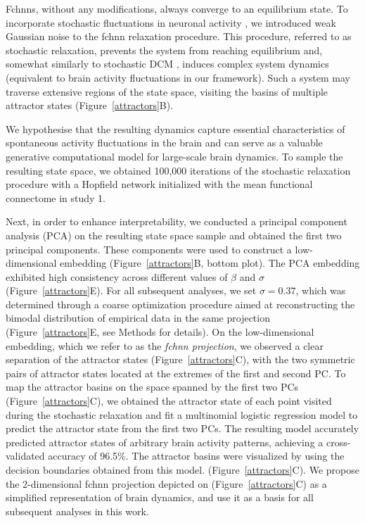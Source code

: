 \documentclass{article}
\begin{document}
Fc\acrshort{hnn}s, without any modifications, always converge to an equilibrium state.
To incorporate stochastic fluctuations in neuronal activity \citep{robinson2005multiscale}, we introduced weak
Gaussian noise to the \acrshort{fchnn} relaxation procedure. This procedure, referred to as stochastic relaxation, prevents the system from reaching equilibrium and, somewhat similarly to stochastic DCM \citep{daunizeau2012stochastic}, induces complex system dynamics (equivalent to brain activity fluctuations in our framework). Such a system may traverse extensive regions of the state space, visiting the basins of multiple attractor states (Figure~\ref{attractors}B).

We hypothesise that the resulting dynamics capture essential characteristics of spontaneous activity fluctuations in the brain and can serve as a valuable generative computational model for large-scale brain dynamics. To sample the resulting state space, we obtained 100,000 iterations of the stochastic relaxation procedure with a Hopfield network initialized with the mean functional connectome in study 1.

Next, in order to enhance interpretability, we conducted a principal component analysis (PCA) on the resulting state space sample and obtained the first two principal components.
These components were used to construct a low-dimensional embedding (Figure~\ref{attractors}B, bottom plot).
The PCA embedding exhibited high consistency across different values of $\beta$ and $\sigma$ (Figure~\ref{attractors}E).
For all subsequent analyses, we set $\sigma=0.37$, which was determined through a coarse optimization procedure aimed at reconstructing the bimodal distribution of empirical data in the same projection (Figure~\ref{attractors}E,
see Methods for details). On the low-dimensional embedding, which we refer to as the \textit{\acrshort{fchnn} projection}, we observed a clear separation of the attractor states (Figure~\ref{attractors}C), with the two symmetric pairs of attractor states located at the extremes of the first and second PC.
To map the attractor basins on the space spanned by the first two PCs (Figure~\ref{attractors}C), we obtained the attractor state of each point visited during the stochastic relaxation and fit a multinomial logistic regression model to predict the attractor state from the first two PCs.
The resulting model accurately predicted attractor states of arbitrary brain activity patterns, achieving a cross-validated accuracy of 96.5\%.
The attractor basins were visualized by using the decision boundaries obtained from this model. (Figure~\ref{attractors}C). We propose the 2-dimensional \acrshort{fchnn} projection depicted on (Figure~\ref{attractors}C) as a simplified representation of brain dynamics, and use it as a basis for all subsequent analyses in this work.
\end{document}
